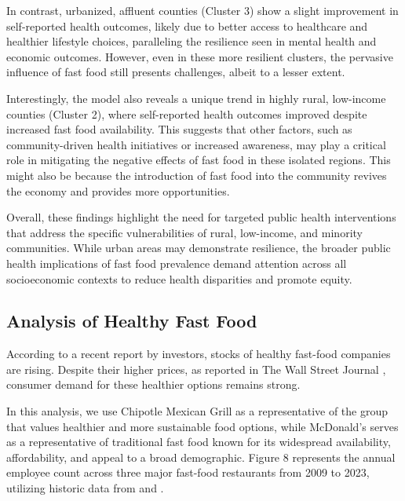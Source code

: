 \documentclass[letterpaper, 11pt]{report}
\begin{document}
In contrast, urbanized, affluent counties (Cluster 3) show a slight improvement in self-reported health outcomes, likely due to better access to healthcare and healthier lifestyle choices, paralleling the resilience seen in mental health and economic outcomes. However, even in these more resilient clusters, the pervasive influence of fast food still presents challenges, albeit to a lesser extent.

Interestingly, the model also reveals a unique trend in highly rural, low-income counties (Cluster 2), where self-reported health outcomes improved despite increased fast food availability. This suggests that other factors, such as community-driven health initiatives or increased awareness, may play a critical role in mitigating the negative effects of fast food in these isolated regions. This might also be because the introduction of fast food into the community revives the economy and provides more opportunities.

Overall, these findings highlight the need for targeted public health interventions that address the specific vulnerabilities of rural, low-income, and minority communities. While urban areas may demonstrate resilience, the broader public health implications of fast food prevalence demand attention across all socioeconomic contexts to reduce health disparities and promote equity.


\subsection{Analysis of Healthy Fast Food}

According to a recent report by investors, stocks of healthy fast-food companies are rising. \cite {investors2024_chipotle} Despite their higher prices, as reported in The Wall Street Journal \cite{wsj2024_chipotle}, consumer demand for these healthier options remains strong. 

In this analysis, we use Chipotle Mexican Grill as a representative of the group that values healthier and more sustainable food options, while McDonald's serves as a representative of traditional fast food known for its widespread availability, affordability, and appeal to a broad demographic. Figure 8 represents the annual employee count across three major fast-food restaurants from 2009 to 2023, utilizing historic data from \cite{mcdonalds2024_employees} and \cite{macrotrends2024_chipotle_employees}. 
\end{document}
